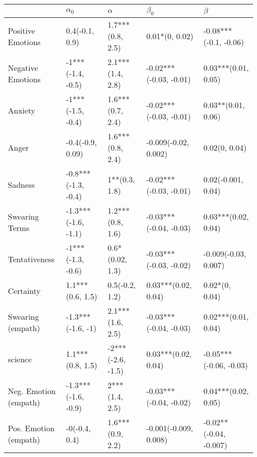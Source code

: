 \begin{tabular}{lllll}
\toprule
{} &           $\alpha_0$ &           $\alpha$ &               $\beta_0$ &                 $\beta$ \\
\midrule
Positive Emotions     &       0.4(-0.1, 0.9) &   1.7***(0.8, 2.5) &          0.01*(0, 0.02) &   -0.08***(-0.1, -0.06) \\
Negative Emotions     &    -1***(-1.4, -0.5) &   2.1***(1.4, 2.8) &  -0.02***(-0.03, -0.01) &     0.03***(0.01, 0.05) \\
Anxiety               &    -1***(-1.5, -0.4) &   1.6***(0.7, 2.4) &  -0.02***(-0.03, -0.01) &      0.03**(0.01, 0.06) \\
Anger                 &     -0.4(-0.9, 0.09) &   1.6***(0.8, 2.4) &    -0.009(-0.02, 0.002) &           0.02(0, 0.04) \\
Sadness               &  -0.8***(-1.3, -0.4) &      1**(0.3, 1.8) &  -0.02***(-0.03, -0.01) &      0.02(-0.001, 0.04) \\
Swearing Terms        &  -1.3***(-1.6, -1.1) &   1.2***(0.8, 1.6) &  -0.03***(-0.04, -0.03) &     0.03***(0.02, 0.04) \\
Tentativeness         &    -1***(-1.3, -0.6) &    0.6*(0.02, 1.3) &  -0.03***(-0.03, -0.02) &    -0.009(-0.03, 0.007) \\
Certainty             &     1.1***(0.6, 1.5) &     0.5(-0.2, 1.2) &     0.03***(0.02, 0.04) &          0.02*(0, 0.04) \\
Swearing (empath)     &    -1.3***(-1.6, -1) &   2.1***(1.6, 2.5) &  -0.03***(-0.04, -0.03) &     0.02***(0.01, 0.04) \\
science               &     1.1***(0.8, 1.5) &  -2***(-2.6, -1.5) &     0.03***(0.02, 0.04) &  -0.05***(-0.06, -0.03) \\
Neg. Emotion (empath) &  -1.3***(-1.6, -0.9) &     2***(1.4, 2.5) &  -0.03***(-0.04, -0.02) &     0.04***(0.02, 0.05) \\
Pos. Emotion (empath) &        -0(-0.4, 0.4) &   1.6***(0.9, 2.2) &   -0.001(-0.009, 0.008) &  -0.02**(-0.04, -0.007) \\
\bottomrule
\end{tabular}
